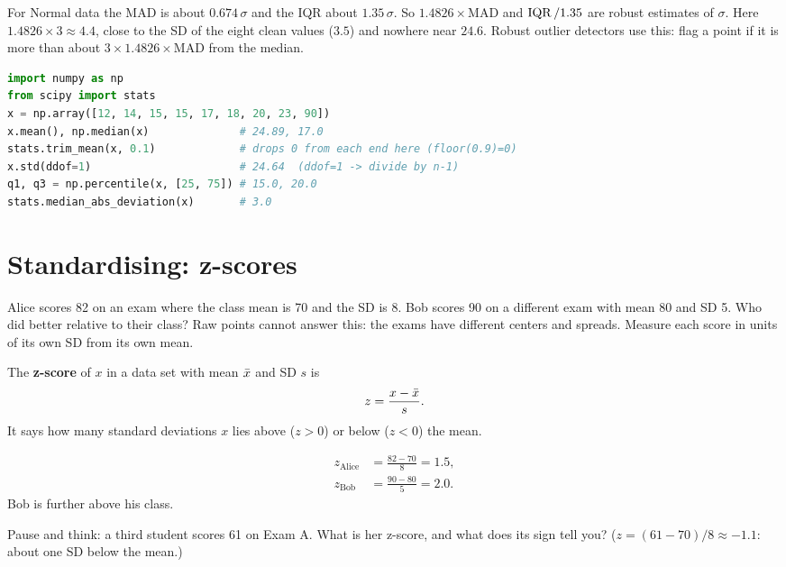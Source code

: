 \begin{remark}
For Normal data the MAD is about $0.674\,\sigma$ and the IQR about $1.35\,\sigma$.
So $1.4826 \times \text{MAD}$ and $\operatorname{IQR}/1.35$ are robust estimates of $\sigma$.
Here $1.4826 \times 3 \approx 4.4$, close to the SD of the eight clean values
($3.5$) and nowhere near $24.6$. Robust outlier detectors use this: flag a point if
it is more than about $3 \times 1.4826 \times \text{MAD}$ from the median.
\end{remark}

\begin{lstlisting}[language=Python]
import numpy as np
from scipy import stats
x = np.array([12, 14, 15, 15, 17, 18, 20, 23, 90])
x.mean(), np.median(x)              # 24.89, 17.0
stats.trim_mean(x, 0.1)             # drops 0 from each end here (floor(0.9)=0)
x.std(ddof=1)                       # 24.64  (ddof=1 -> divide by n-1)
q1, q3 = np.percentile(x, [25, 75]) # 15.0, 20.0
stats.median_abs_deviation(x)       # 3.0
\end{lstlisting}

\section{Standardising: z-scores}
\label{sec:center-spread-z}

Alice scores 82 on an exam where the class mean is 70 and the SD is 8. Bob scores
90 on a different exam with mean 80 and SD 5. Who did better relative to their class?
Raw points cannot answer this: the exams have different centers and spreads.
Measure each score in units of its own SD from its own mean.

\begin{definition}[z-score]
The \textbf{z-score} of $x$ in a data set with mean $\bar{x}$ and SD $s$ is
\[
  z = \frac{x - \bar{x}}{s} .
\]
It says how many standard deviations $x$ lies above ($z>0$) or below ($z<0$) the mean.
\end{definition}

\begin{align*}
  z_{\text{Alice}} &= \frac{82 - 70}{8} = 1.5, \\
  z_{\text{Bob}} &= \frac{90 - 80}{5} = 2.0 .
\end{align*}
Bob is further above his class.

\begin{recoverybox}
Pause and think: a third student scores 61 on Exam A. What is her z-score, and what
does its sign tell you? ($z = (61-70)/8 \approx -1.1$: about one SD below the mean.)
\end{recoverybox}

